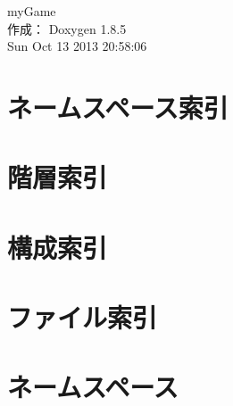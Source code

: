 \documentclass[twoside]{book}
\newcommand{\clearemptydoublepage}{%
  \newpage{\pagestyle{empty}\cleardoublepage}%
}
\begin{document}
\hypersetup{pageanchor=false}
\begin{titlepage}
\vspace*{7cm}
\begin{center}%
{\Large my\-Game }\\
\vspace*{1cm}
{\large 作成： Doxygen 1.8.5}\\
\vspace*{0.5cm}
{\small Sun Oct 13 2013 20:58:06}\\
\end{center}
\end{titlepage}
\clearemptydoublepage
\tableofcontents
\clearemptydoublepage
{}
\hypersetup{pageanchor=true}

\chapter{ネームスペース索引}

\chapter{階層索引}

\chapter{構成索引}

\chapter{ファイル索引}

\chapter{ネームスペース}

\end{document}
